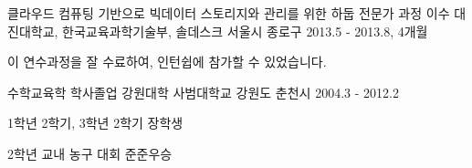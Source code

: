 

\begin{cventries}

  \cventry
    {클라우드 컴퓨팅 기반으로 빅데이터 스토리지와 관리를 위한 하둡 전문가 과정 이수} %
    {대진대학교, 한국교육과학기술부, 솔데스크} %
    {서울시 종로구} %
    {2013.5 - 2013.8, 4개월} %
    {
      \begin{cvitems} %
        \item {이 연수과정을 잘 수료하여, 인턴쉽에 참가할 수 있었습니다.}
      \end{cvitems}
    }

  \cventry
    {수학교육학 학사졸업} %
    {강원대학 사범대학교} %
    {강원도 춘천시} %
    {2004.3 - 2012.2} %
    {
      \begin{cvitems} %
        \item {1학년 2학기, 3학년 2학기 장학생}
        \item {2학년 교내 농구 대회 준준우승}
      \end{cvitems}
    }

\end{cventries}
